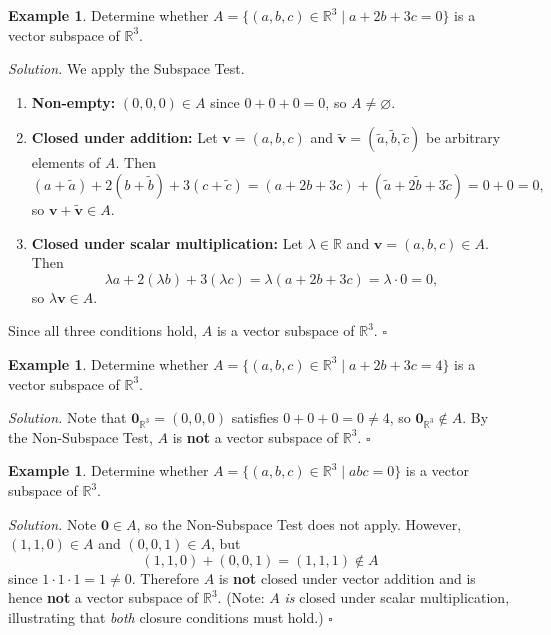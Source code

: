 \documentclass[11pt, a4paper, notitlepage]{report}
\theoremstyle{definition}
\newtheorem{example}[theorem]{Example}
\theoremstyle{remark}
\begin{document}
\begin{example}\label{ex:subspace-hyperplane}
Determine whether $A = \{(a, b, c) \in \mathbb{R}^3 \mid a + 2b + 3c = 0\}$ is a vector subspace of $\mathbb{R}^3$.

\emph{Solution.} We apply the Subspace Test.
\begin{enumerate}
  \item \textbf{Non-empty:} $(0, 0, 0) \in A$ since $0 + 0 + 0 = 0$, so $A \neq \varnothing$.
  \item \textbf{Closed under addition:} Let $\mathbf{v} = (a, b, c)$ and $\tilde{\mathbf{v}} = (\tilde{a}, \tilde{b}, \tilde{c})$ be arbitrary elements of $A$. Then
    \[ (a + \tilde{a}) + 2(b + \tilde{b}) + 3(c + \tilde{c}) = (a + 2b + 3c) + (\tilde{a} + 2\tilde{b} + 3\tilde{c}) = 0 + 0 = 0, \]
    so $\mathbf{v} + \tilde{\mathbf{v}} \in A$.
  \item \textbf{Closed under scalar multiplication:} Let $\lambda \in \mathbb{R}$ and $\mathbf{v} = (a, b, c) \in A$. Then
    \[ \lambda a + 2(\lambda b) + 3(\lambda c) = \lambda(a + 2b + 3c) = \lambda \cdot 0 = 0, \]
    so $\lambda \mathbf{v} \in A$.
\end{enumerate}
Since all three conditions hold, $A$ is a vector subspace of $\mathbb{R}^3$. $\square$
\end{example}

\begin{example}\label{ex:non-subspace-affine}
Determine whether $A = \{(a, b, c) \in \mathbb{R}^3 \mid a + 2b + 3c = 4\}$ is a vector subspace of $\mathbb{R}^3$.

\emph{Solution.} Note that $\mathbf{0}_{\mathbb{R}^3} = (0, 0, 0)$ satisfies $0 + 0 + 0 = 0 \neq 4$, so $\mathbf{0}_{\mathbb{R}^3} \notin A$. By the Non-Subspace Test, $A$ is \textbf{not} a vector subspace of $\mathbb{R}^3$. $\square$
\end{example}

\begin{example}\label{ex:non-subspace-product}
Determine whether $A = \{(a, b, c) \in \mathbb{R}^3 \mid abc = 0\}$ is a vector subspace of $\mathbb{R}^3$.

\emph{Solution.} Note $\mathbf{0} \in A$, so the Non-Subspace Test does not apply. However, $(1, 1, 0) \in A$ and $(0, 0, 1) \in A$, but
\[ (1, 1, 0) + (0, 0, 1) = (1, 1, 1) \notin A \]
since $1 \cdot 1 \cdot 1 = 1 \neq 0$. Therefore $A$ is \textbf{not} closed under vector addition and is hence \textbf{not} a vector subspace of $\mathbb{R}^3$. (Note: $A$ \emph{is} closed under scalar multiplication, illustrating that \emph{both} closure conditions must hold.) $\square$
\end{example}
\end{document}
